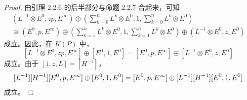 \begin{proof}
  由引理 2.2.6 的后半部分与命题 2.2.7 合起来，可知
  \[
  \begin{gathered}
  (L^{-1}\otimes E^0,zp,E^\infty)\oplus\left(\sum_{k=0}^{n}L^k\otimes E^0,1,\sum_{k=0}^{n}L^k\otimes E^0\right)\\
  \cong(E^0,p,E^\infty)\oplus\left(\sum_{k=1}^{n}L^k\otimes E^0,1,\sum_{k=1}^{n}L^k\otimes E^0\right)\oplus(L^{-1}\otimes E^0,z,E^0)
  \end{gathered}
  \]
  成立。因此，在 $K(P)$ 中，
  \[
  [L^{-1}\otimes E^0,zp,E^\infty]\oplus[E^0,1,E^0]=[E^0,p,E^\infty]\oplus[L^{-1}\otimes E^0,z,E^0]
  \]
  成立。由于 $[\underline{1},z,L]=[H^{-1}]$，
  \begin{equation*}
  \resizebox{0.96\textwidth}{!}{$\displaystyle [L^{-1}][H^{-1}][E^0,p,E^\infty]\oplus[E^0,1,E^0]=[E^0,p,E^\infty]\oplus[L^{-1}][H^{-1}][E^0,1,E^0]$}
  \end{equation*}
  成立。
\end{proof}

